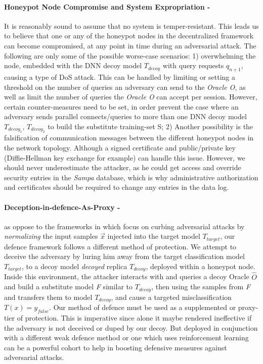 \documentclass[grad,lot,lof,11pt,oneside,onehalfspace]{RUthesis}
\begin{document}
\paragraph{Honeypot Node Compromise and System Expropriation -} It is reasonably sound to assume that no system is temper-resistant. This leads us to believe that one or any of the honeypot nodes in the decentralized framework can become compromised, at any point in time during an adversarial attack. The following are only some of the possible worse-case scenarios: 1) overwhelming the node, embedded with the DNN decoy model \textit{$T_{decoy}$} with query requests $q_{n+1}$, causing a type of DoS attack. This can be handled by limiting or setting a threshold on the number of queries an adversary can send to the \textit{Oracle O}, as well as limit the number of queries the \textit{Oracle O} can accept per session. However, certain counter-measures need to be set, in order prevent the case where an adversary sends parallel connects/queries to more than one DNN decoy model \textit{$T_{decoy_{ 1}}$}, \textit{$T_{decoy_{ 2}}$} to build the substitute training-set S; 2) Another possibility is the falsification of communication messages between the different honeypot nodes in the network topology. Although a signed certificate and public/private key (Diffie-Hellman key exchange for example) can handle this issue. However, we should never underestimate the attacker, as he could get access and override security entries in the \textit{Sampa} database, which is why administrative authorization and certificates should be required to change any entries in the data log.  
\paragraph{Deception-in-defence-As-Proxy -} as oppose to the frameworks in \cite{zantedeschi_efficient_2017} \cite{hosseini_blocking_2017}\cite{madry_towards_nodate} which focus on curbing adversarial attacks by \textit{normalizing} the input samples $\vec{x}$ injected into the target model \textit{$T_{target}$}, our defence framework follows a different method of protection. We attempt to deceive the adversary by luring him away from the target classification model $T_{\textit{target}}$, to a decoy model \textit{decoyed} replica $T_{\textit{decoy}}$, deployed within a honeypot node. Inside this environment, the attacker interacts with and queries a decoy Oracle \textit{$\hat{O}$} and build a substitute model \textit{F} similar to $T_{\textit{decoy}}$, then using the samples from \textit{F} and transfers them to model $T_{\textit{decoy}}$, and cause a targeted misclassification \textit{$T(x) = y_{false}$}. Our method of defence must be used as a supplemented or proxy-tier of protection. This is imperative since alone it maybe rendered ineffective if the adversary is not deceived or duped by our decoy. But deployed in conjunction with a different weak defence method or one which uses reinforcement learning can be a powerful cohort to help in boosting defensive measures against adversarial attacks.     
\end{document}

